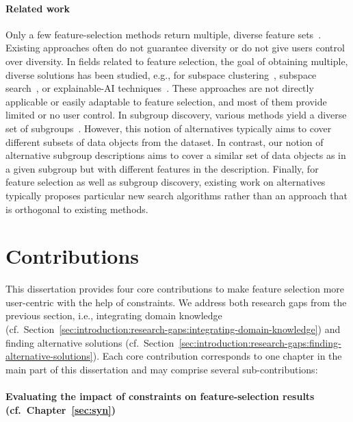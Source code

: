 \paragraph{Related work}

Only a few feature-selection methods return multiple, diverse feature sets~\cite{borboudakis2021extending}.
Existing approaches often do not guarantee diversity or do not give users control over diversity.
In fields related to feature selection, the goal of obtaining multiple, diverse solutions has been studied, e.g., for subspace clustering~\cite{hu2018subspace, mueller2009relevant}, subspace search~\cite{trittenbach2019dimension}, or explainable-AI techniques~\cite{artelt2022even, kim2016examples, mothilal2020explaining, russell2019efficient}.
These approaches are not directly applicable or easily adaptable to feature selection, and most of them provide limited or no user control.
In subgroup discovery, various methods yield a diverse set of subgroups~\cite{belfodil2019fssd, bosc2018anytime, leeuwen2012diverse, lemmerich2010fast, lucas2018ssdp+, proencca2022robust}.
However, this notion of alternatives typically aims to cover different subsets of data objects from the dataset.
In contrast, our notion of alternative subgroup descriptions aims to cover a similar set of data objects as in a given subgroup but with different features in the description.
Finally, for feature selection as well as subgroup discovery, existing work on alternatives typically proposes particular new search algorithms rather than an approach that is orthogonal to existing methods.

\section{Contributions}
\label{sec:introductions:contributions}

This dissertation provides four core contributions to make feature selection more user-centric with the help of constraints.
We address both research gaps from the previous section, i.e., integrating domain knowledge (cf.~Section~\ref{sec:introduction:research-gaps:integrating-domain-knowledge}) and finding alternative solutions (cf.~Section~\ref{sec:introduction:research-gaps:finding-alternative-solutions}).
Each core contribution corresponds to one chapter in the main part of this dissertation and may comprise several sub-contributions:

\paragraph{Evaluating the impact of constraints on feature-selection results (cf.~Chapter~\ref{sec:syn})}

